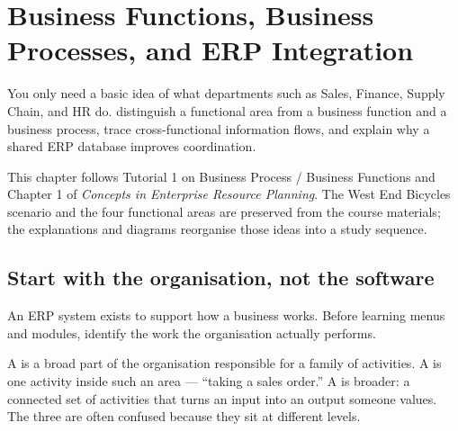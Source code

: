 \chapter{Business Functions, Business Processes, and ERP Integration}
\label{ch:business-processes}

\chapterguide
  {You only need a basic idea of what departments such as Sales, Finance, Supply Chain, and HR do.}
  {distinguish a functional area from a business function and a business process, trace cross-functional information flows, and explain why a shared ERP database improves coordination.}

\begin{sourcebasis}
This chapter follows Tutorial 1 on Business Process / Business Functions and
Chapter 1 of \emph{Concepts in Enterprise Resource Planning}. The West End
Bicycles scenario and the four functional areas are preserved from the course
materials; the explanations and diagrams reorganise those ideas into a study
sequence.
\end{sourcebasis}

\section{Start with the organisation, not the software}

An ERP system exists to support how a business works. Before learning menus and
modules, identify the work the organisation actually performs.

A  is a broad part of the organisation responsible for a
family of activities. A  is one activity inside such an
area --- ``taking a sales order.'' A  is broader: a
connected set of activities that turns an input into an output someone values.
The three are often confused because they sit at different levels.

